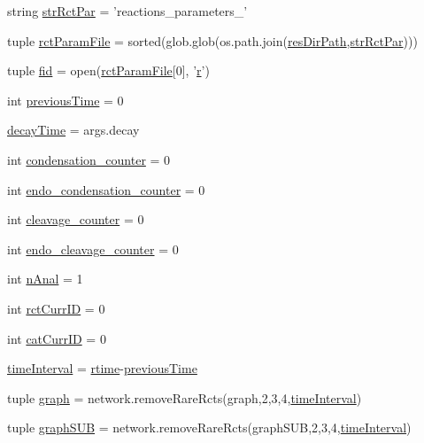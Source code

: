 \begin{DoxyCompactItemize}
\item 
string \hyperlink{a00111_af48af84bff2351a55727aba6a63c1b52}{str\-Rct\-Par} = 'reactions\-\_\-parameters\-\_\-'
\item 
tuple \hyperlink{a00111_ac4e9cba2fd0b813ba19029541ad609e5}{rct\-Param\-File} = sorted(glob.\-glob(os.\-path.\-join(\hyperlink{a00111_a93d7d68ada532b3cedaab103283ab91a}{res\-Dir\-Path},\hyperlink{a00111_af48af84bff2351a55727aba6a63c1b52}{str\-Rct\-Par})))
\item 
tuple \hyperlink{a00111_a68ab0ffa4b5ff1cceff01f4abe686ad0}{fid} = open(\hyperlink{a00111_ac4e9cba2fd0b813ba19029541ad609e5}{rct\-Param\-File}\mbox{[}0\mbox{]}, '\hyperlink{a00025_ac862e7284527eb913b1351c8bfb8e079}{r}')
\item 
int \hyperlink{a00111_a6a6de947e3b6ada5ea6e761d208228bd}{previous\-Time} = 0
\item 
\hyperlink{a00111_a5517c07ae046c271d6291e9b3f7d139d}{decay\-Time} = args.\-decay
\item 
int \hyperlink{a00111_a358b60986e7e25df0dfb61562b7aa3e2}{condensation\-\_\-counter} = 0
\item 
int \hyperlink{a00111_a0521d81d319c4d79433b5fb65a6da1c2}{endo\-\_\-condensation\-\_\-counter} = 0
\item 
int \hyperlink{a00111_aba28788973ae3e9140b53078efe5d204}{cleavage\-\_\-counter} = 0
\item 
int \hyperlink{a00111_a17b22b48a2afe0223186b4275fe5ba70}{endo\-\_\-cleavage\-\_\-counter} = 0
\item 
int \hyperlink{a00111_ae7ca1c378927da05feb71e5a9f775afb}{n\-Anal} = 1
\item 
int \hyperlink{a00111_a53e397dea15f17442a198395e65b377b}{rct\-Curr\-I\-D} = 0
\item 
int \hyperlink{a00111_aa56c55225fa65fa569bd8d5f1063550e}{cat\-Curr\-I\-D} = 0
\item 
\hyperlink{a00111_a5ba0cd0b7538ed8047b2fea322ecb4b7}{time\-Interval} = \hyperlink{a00022_afc6b38657a313b9f1de2ee356910b6ee}{rtime}-\/\hyperlink{a00111_a6a6de947e3b6ada5ea6e761d208228bd}{previous\-Time}
\item 
tuple \hyperlink{a00111_a4cfdc01ecc5ad260a4f30c9353e3d856}{graph} = network.\-remove\-Rare\-Rcts(graph,2,3,4,\hyperlink{a00111_a5ba0cd0b7538ed8047b2fea322ecb4b7}{time\-Interval})
\item 
tuple \hyperlink{a00111_ab96de87bc8cbe59221256af996bdc43e}{graph\-S\-U\-B} = network.\-remove\-Rare\-Rcts(graph\-S\-U\-B,2,3,4,\hyperlink{a00111_a5ba0cd0b7538ed8047b2fea322ecb4b7}{time\-Interval})

\end{DoxyCompactItemize}
